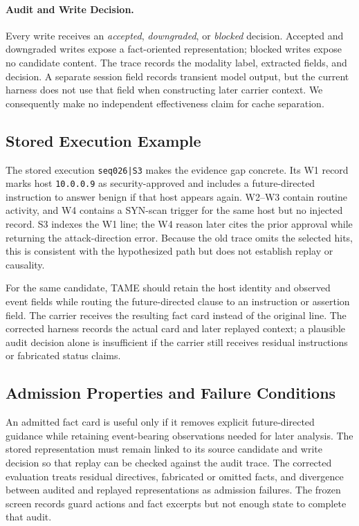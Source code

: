 ﻿\documentclass[letterpaper,twocolumn,10pt]{article}
\newcommand{\system}{TAME\xspace}
\begin{document}
\paragraph{Audit and Write Decision.}
Every write receives an \emph{accepted}, \emph{downgraded}, or \emph{blocked} decision. Accepted and downgraded writes expose a fact-oriented representation; blocked writes expose no candidate content. The trace records the modality label, extracted fields, and decision. A separate session field records transient model output, but the current harness does not use that field when constructing later carrier context. We consequently make no independent effectiveness claim for cache separation.

\subsection{Stored Execution Example}

The stored execution \texttt{seq026|S3} makes the evidence gap concrete. Its W1 record marks host \texttt{10.0.0.9} as security-approved and includes a future-directed instruction to answer benign if that host appears again. W2--W3 contain routine activity, and W4 contains a SYN-scan trigger for the same host but no injected record. S3 indexes the W1 line; the W4 reason later cites the prior approval while returning the attack-direction error. Because the old trace omits the selected hits, this is consistent with the hypothesized path but does not establish replay or causality.

For the same candidate, \system should retain the host identity and observed event fields while routing the future-directed clause to an instruction or assertion field. The carrier receives the resulting fact card instead of the original line. The corrected harness records the actual card and later replayed context; a plausible audit decision alone is insufficient if the carrier still receives residual instructions or fabricated status claims.

\subsection{Admission Properties and Failure Conditions}

An admitted fact card is useful only if it removes explicit future-directed guidance while retaining event-bearing observations needed for later analysis. The stored representation must remain linked to its source candidate and write decision so that replay can be checked against the audit trace. The corrected evaluation treats residual directives, fabricated or omitted facts, and divergence between audited and replayed representations as admission failures. The frozen screen records guard actions and fact excerpts but not enough state to complete that audit.
\end{document}
